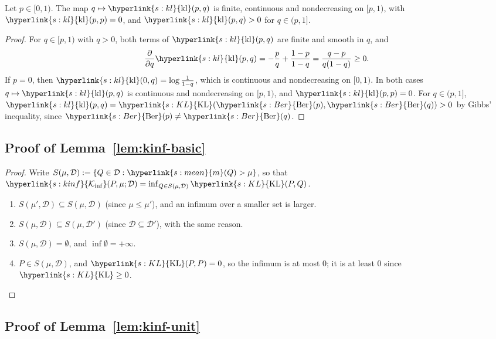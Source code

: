 \documentclass[11pt]{article}
\newcommand{\sy}[2]{{\hyperlink{#1}{#2}}}
\newcommand{\mean}{\sy{s:mean}{m}}
\newcommand{\KL}{\sy{s:KL}{\mathrm{KL}}}
\newcommand{\kl}{\sy{s:kl}{\mathrm{kl}}}
\newcommand{\Ber}{\sy{s:Ber}{\mathrm{Ber}}}
\newcommand{\Kinf}{\sy{s:kinf}{\mathcal{K}_{\inf}}}
\begin{document}
\begin{lemma}\label{lem:kl}
Let $p\in[0,1)$. The map $q\mapsto\kl(p,q)$ is finite, continuous and nondecreasing on $[p,1)$, with
$\kl(p,p)=0$, and $\kl(p,q)>0$ for $q\in(p,1]$.
\end{lemma}

\begin{proof}
For $q\in[p,1)$ with $q>0$, both terms of $\kl(p,q)$ are finite and smooth in $q$, and
\begin{equation*}
  \frac{\partial}{\partial q}\kl(p,q)=-\frac pq+\frac{1-p}{1-q}=\frac{q-p}{q(1-q)}\ge0.
\end{equation*}
If $p=0$, then $\kl(0,q)=\log\frac1{1-q}$, which is continuous and nondecreasing on $[0,1)$. In both
cases $q\mapsto\kl(p,q)$ is continuous and nondecreasing on $[p,1)$, and $\kl(p,p)=0$. For $q\in(p,1]$,
$\kl(p,q)=\KL(\Ber(p),\Ber(q))>0$ by Gibbs' inequality, since $\Ber(p)\ne\Ber(q)$.
\end{proof}

\subsection{Proof of Lemma~\ref{lem:kinf-basic}}\label{sec:proof-kinf-basic}

\begin{proof}
Write $S(\mu,\mathcal D):=\{Q\in\mathcal D:\mean(Q)>\mu\}$, so that
$\Kinf(P,\mu;\mathcal D)=\inf_{Q\in S(\mu,\mathcal D)}\KL(P,Q)$.
\begin{enumerate}[label=(\roman*)]
  \item $S(\mu',\mathcal D)\subseteq S(\mu,\mathcal D)$ (since $\mu\le\mu'$), and an infimum over a
  smaller set is larger.
  \item $S(\mu,\mathcal D)\subseteq S(\mu,\mathcal D')$ (since $\mathcal D\subseteq\mathcal D'$), with
  the same reason.
  \item $S(\mu,\mathcal D)=\emptyset$, and $\inf\emptyset=+\infty$.
  \item $P\in S(\mu,\mathcal D)$, and $\KL(P,P)=0$, so the infimum is at most $0$; it is at least $0$
  since $\KL\ge0$.\qedhere
\end{enumerate}
\end{proof}

\subsection{Proof of Lemma~\ref{lem:kinf-unit}}\label{sec:proof-kinf-unit}
\end{document}
